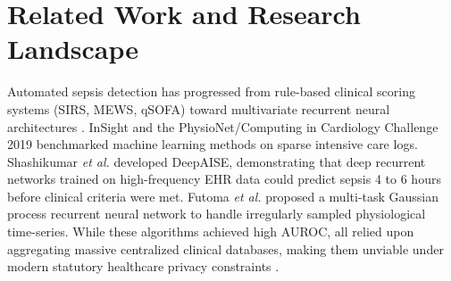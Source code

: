 \documentclass[journal,twocolumn,10pt]{IEEEtran}
\begin{document}
\section{Related Work and Research Landscape}
Automated sepsis detection has progressed from rule-based clinical scoring systems (SIRS, MEWS, qSOFA) toward multivariate recurrent neural architectures \cite{singer2016sepsis3,desautels2016prediction}. InSight \cite{desautels2016prediction} and the PhysioNet/Computing in Cardiology Challenge 2019 \cite{reyna2020physionet} benchmarked machine learning methods on sparse intensive care logs. Shashikumar \textit{et al.} \cite{shashikumar2021deepai} developed DeepAISE, demonstrating that deep recurrent networks trained on high-frequency EHR data could predict sepsis 4 to 6 hours before clinical criteria were met. Futoma \textit{et al.} \cite{futoma2017learning} proposed a multi-task Gaussian process recurrent neural network to handle irregularly sampled physiological time-series. While these algorithms achieved high AUROC, all relied upon aggregating massive centralized clinical databases, making them unviable under modern statutory healthcare privacy constraints \cite{kaissis2020trustworthy}.

\begin{table}[!t]
\centering
\caption{Comparative Taxonomy of Related Frameworks vs. Proposed FPDAF-v2}\label{tab:gap_analysis}
\scriptsize
\renewcommand{\arraystretch}{1.2}
\end{table}
\end{document}
